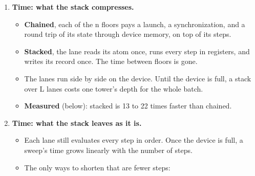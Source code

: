 \begin{enumerate}
\begin{itemize}
\item Each step's width follows from its operands' widths.
\item A register the imprint can show is never negative carries that fact forward:

\begin{itemize}
\item a field read unsigned, a constant, an absolute value, a gcd, a table entry;
\item a sum, product, quotient or xor of two such registers;
\item an and with one such register.
\end{itemize}
\item With that fact, an and is no wider than its never-negative operand, and an xor of two never-negative registers is no wider than the wider one. A stack of rounds on fixed-width words then retains its words at their width through every floor, instead of growing a bit per round.
\item Every width is checked against the values: the bitwise oracle rebuilds each output bit from the raw fields and requires the sign to hold 64 bits past the written width.
\end{itemize}
\item \textbf{Time: what the stack compresses.}

\begin{itemize}
\item \textbf{Chained}, each of the n floors pays a launch, a synchronization, and a round trip of its state through device memory, on top of its steps.
\item \textbf{Stacked}, the lane reads its atom once, runs every step in registers, and writes its record once. The time between floors is gone.
\item The lanes run side by side on the device. Until the device is full, a stack over L lanes costs one tower's depth for the whole batch.
\item \textbf{Measured} (below): stacked is 13 to 22 times faster than chained.
\end{itemize}
\item \textbf{Time: what the stack leaves as it is.}

\begin{itemize}
\item Each lane still evaluates every step in order. Once the device is full, a sweep's time grows linearly with the number of steps.
\item The only ways to shorten that are fewer steps:


\end{itemize}
\end{enumerate}
